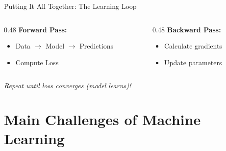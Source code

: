 \begin{frame}{Putting It All Together: The Learning Loop}
    \vspace{0.5em}
    
    \begin{columns}[T]
        \begin{column}{0.48\textwidth}
            \textbf{Forward Pass:}
            \begin{itemize}
                \item Data $\to$ Model $\to$ Predictions
                \item Compute Loss
            \end{itemize}
        \end{column}
        
        \begin{column}{0.48\textwidth}
            \textbf{Backward Pass:}
            \begin{itemize}
                \item Calculate gradients
                \item Update parameters
            \end{itemize}
        \end{column}
    \end{columns}
    
    \vspace{0.25em}
    \centering
    \textit{Repeat until loss converges (model learns)!}
    
\end{frame}









\section{Main Challenges of Machine Learning}

